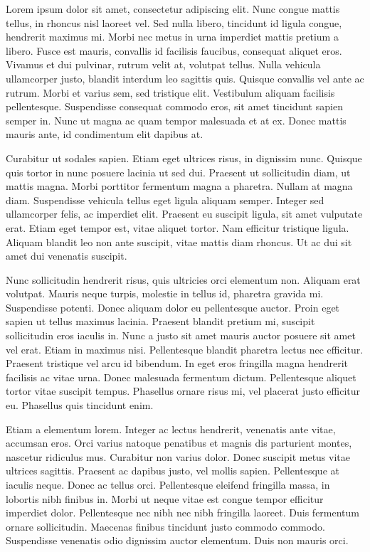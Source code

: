\documentclass[a4paper,12pt,twoside]{ThesisStyle}
\begin{document}
\begin{appendices}
Lorem ipsum dolor sit amet, consectetur adipiscing elit. Nunc congue mattis tellus, in rhoncus nisl laoreet vel. Sed nulla libero, tincidunt id ligula congue, hendrerit maximus mi. Morbi nec metus in urna imperdiet mattis pretium a libero. Fusce est mauris, convallis id facilisis faucibus, consequat aliquet eros. Vivamus et dui pulvinar, rutrum velit at, volutpat tellus. Nulla vehicula ullamcorper justo, blandit interdum leo sagittis quis. Quisque convallis vel ante ac rutrum. Morbi et varius sem, sed tristique elit. Vestibulum aliquam facilisis pellentesque. Suspendisse consequat commodo eros, sit amet tincidunt sapien semper in. Nunc ut magna ac quam tempor malesuada et at ex. Donec mattis mauris ante, id condimentum elit dapibus at.

Curabitur ut sodales sapien. Etiam eget ultrices risus, in dignissim nunc. Quisque quis tortor in nunc posuere lacinia ut sed dui. Praesent ut sollicitudin diam, ut mattis magna. Morbi porttitor fermentum magna a pharetra. Nullam at magna diam. Suspendisse vehicula tellus eget ligula aliquam semper. Integer sed ullamcorper felis, ac imperdiet elit. Praesent eu suscipit ligula, sit amet vulputate erat. Etiam eget tempor est, vitae aliquet tortor. Nam efficitur tristique ligula. Aliquam blandit leo non ante suscipit, vitae mattis diam rhoncus. Ut ac dui sit amet dui venenatis suscipit.

Nunc sollicitudin hendrerit risus, quis ultricies orci elementum non. Aliquam erat volutpat. Mauris neque turpis, molestie in tellus id, pharetra gravida mi. Suspendisse potenti. Donec aliquam dolor eu pellentesque auctor. Proin eget sapien ut tellus maximus lacinia. Praesent blandit pretium mi, suscipit sollicitudin eros iaculis in. Nunc a justo sit amet mauris auctor posuere sit amet vel erat. Etiam in maximus nisi. Pellentesque blandit pharetra lectus nec efficitur. Praesent tristique vel arcu id bibendum. In eget eros fringilla magna hendrerit facilisis ac vitae urna. Donec malesuada fermentum dictum. Pellentesque aliquet tortor vitae suscipit tempus. Phasellus ornare risus mi, vel placerat justo efficitur eu. Phasellus quis tincidunt enim.

Etiam a elementum lorem. Integer ac lectus hendrerit, venenatis ante vitae, accumsan eros. Orci varius natoque penatibus et magnis dis parturient montes, nascetur ridiculus mus. Curabitur non varius dolor. Donec suscipit metus vitae ultrices sagittis. Praesent ac dapibus justo, vel mollis sapien. Pellentesque at iaculis neque. Donec ac tellus orci. Pellentesque eleifend fringilla massa, in lobortis nibh finibus in. Morbi ut neque vitae est congue tempor efficitur imperdiet dolor. Pellentesque nec nibh nec nibh fringilla laoreet. Duis fermentum ornare sollicitudin. Maecenas finibus tincidunt justo commodo commodo. Suspendisse venenatis odio dignissim auctor elementum. Duis non mauris orci.


\end{appendices}
\end{document}
